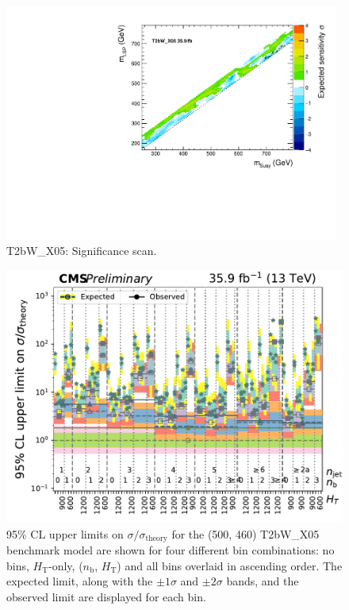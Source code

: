 \begin{figure}[H]
\centering
\includegraphics[width=110mm]{./sec31/T2bW/finalCanvasObsSignif.pdf}
\caption{T2bW\_X05: Significance scan.}
\end{figure}

\begin{figure}[H]
\centering
\includegraphics[width=120mm]{./sec31/T2bW/SMS-T2bW_X05_mStop-500_mLSP-460_25ns_limits_nj_nb_ht.pdf}
\caption{95\% CL upper limits on $\sigma / \sigma_{\mathrm{theory}}$ for the (500, 460) T2bW\_X05 benchmark model are shown for four different bin combinations: no bins, $H_{\mathrm{T}}$-only, ($n_{\mathrm{b}}$, $H_{\mathrm{T}}$) and all bins overlaid in ascending order. The expected limit, along with the $\pm 1 \sigma$ and $\pm 2 \sigma$ bands, and the observed limit are displayed for each bin.}
\end{figure}


